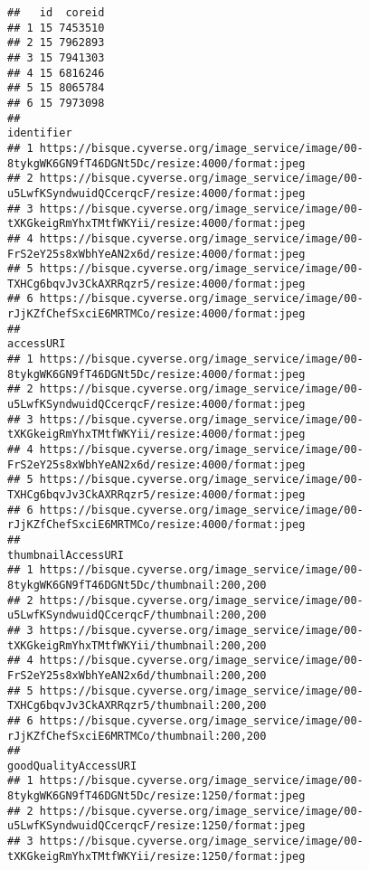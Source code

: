\documentclass[
]{article}
\begin{document}
\begin{verbatim}
##   id  coreid
## 1 15 7453510
## 2 15 7962893
## 3 15 7941303
## 4 15 6816246
## 5 15 8065784
## 6 15 7973098
##                                                                                         identifier
## 1 https://bisque.cyverse.org/image_service/image/00-8tykgWK6GN9fT46DGNt5Dc/resize:4000/format:jpeg
## 2 https://bisque.cyverse.org/image_service/image/00-u5LwfKSyndwuidQCcerqcF/resize:4000/format:jpeg
## 3 https://bisque.cyverse.org/image_service/image/00-tXKGkeigRmYhxTMtfWKYii/resize:4000/format:jpeg
## 4 https://bisque.cyverse.org/image_service/image/00-FrS2eY25s8xWbhYeAN2x6d/resize:4000/format:jpeg
## 5 https://bisque.cyverse.org/image_service/image/00-TXHCg6bqvJv3CkAXRRqzr5/resize:4000/format:jpeg
## 6 https://bisque.cyverse.org/image_service/image/00-rJjKZfChefSxciE6MRTMCo/resize:4000/format:jpeg
##                                                                                          accessURI
## 1 https://bisque.cyverse.org/image_service/image/00-8tykgWK6GN9fT46DGNt5Dc/resize:4000/format:jpeg
## 2 https://bisque.cyverse.org/image_service/image/00-u5LwfKSyndwuidQCcerqcF/resize:4000/format:jpeg
## 3 https://bisque.cyverse.org/image_service/image/00-tXKGkeigRmYhxTMtfWKYii/resize:4000/format:jpeg
## 4 https://bisque.cyverse.org/image_service/image/00-FrS2eY25s8xWbhYeAN2x6d/resize:4000/format:jpeg
## 5 https://bisque.cyverse.org/image_service/image/00-TXHCg6bqvJv3CkAXRRqzr5/resize:4000/format:jpeg
## 6 https://bisque.cyverse.org/image_service/image/00-rJjKZfChefSxciE6MRTMCo/resize:4000/format:jpeg
##                                                                           thumbnailAccessURI
## 1 https://bisque.cyverse.org/image_service/image/00-8tykgWK6GN9fT46DGNt5Dc/thumbnail:200,200
## 2 https://bisque.cyverse.org/image_service/image/00-u5LwfKSyndwuidQCcerqcF/thumbnail:200,200
## 3 https://bisque.cyverse.org/image_service/image/00-tXKGkeigRmYhxTMtfWKYii/thumbnail:200,200
## 4 https://bisque.cyverse.org/image_service/image/00-FrS2eY25s8xWbhYeAN2x6d/thumbnail:200,200
## 5 https://bisque.cyverse.org/image_service/image/00-TXHCg6bqvJv3CkAXRRqzr5/thumbnail:200,200
## 6 https://bisque.cyverse.org/image_service/image/00-rJjKZfChefSxciE6MRTMCo/thumbnail:200,200
##                                                                               goodQualityAccessURI
## 1 https://bisque.cyverse.org/image_service/image/00-8tykgWK6GN9fT46DGNt5Dc/resize:1250/format:jpeg
## 2 https://bisque.cyverse.org/image_service/image/00-u5LwfKSyndwuidQCcerqcF/resize:1250/format:jpeg
## 3 https://bisque.cyverse.org/image_service/image/00-tXKGkeigRmYhxTMtfWKYii/resize:1250/format:jpeg

\end{verbatim}
\end{document}
